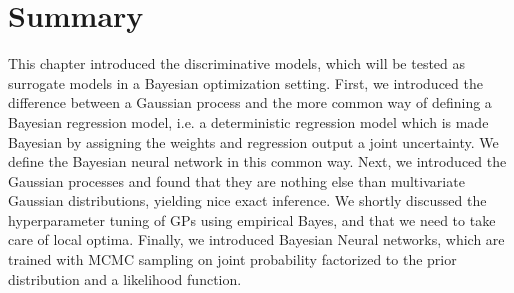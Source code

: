 




\newpage

\section{Summary}
This chapter introduced the discriminative models, which will be tested as surrogate models in a
Bayesian optimization setting. First, we introduced the difference between a Gaussian process and
the more common way of defining a Bayesian regression model, i.e. a deterministic regression model
which is made Bayesian by assigning the weights and regression output a joint uncertainty. We define
the Bayesian neural network in this common way. Next, we introduced the Gaussian processes and found
that they are nothing else than multivariate Gaussian distributions, yielding nice exact inference.
We shortly discussed the hyperparameter tuning of GPs using empirical Bayes, and that we need to
take care of local optima. Finally, we introduced Bayesian Neural networks, which are trained with
MCMC sampling on joint probability factorized to the prior distribution and a likelihood function. 



